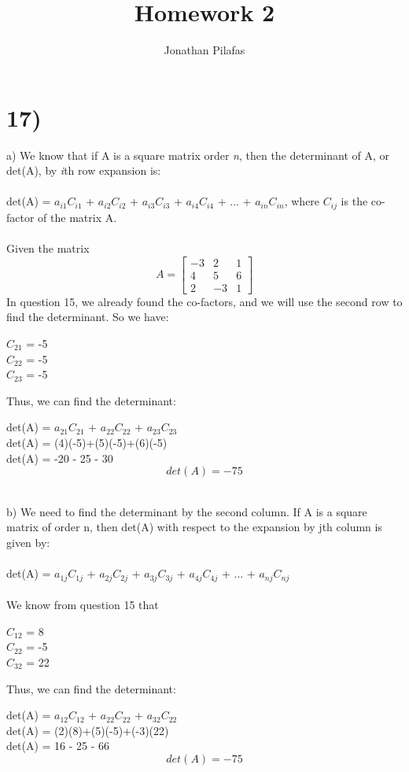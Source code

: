 \documentclass[12pt,a4paper]{extarticle}
\title{Homework 2}
\author{Jonathan Pilafas}
\begin{document}
\maketitle

\section*{17)} 

a) We know that if A is a square matrix order \textit{n}, then the determinant of A, or det(A), by \textit{i}th row 
expansion is:
\\
\\
det(A) = $a_{i1}$$C_{i1}$ + $a_{i2}$$C_{i2}$ + $a_{i3}$$C_{i3}$ + $a_{i4}$$C_{i4}$ + ... + $a_{in}$$C_{in}$, where 
$C_{ij}$ is the co-factor of the matrix A.
\\
\\
Given the matrix
\[
	A = \begin{bmatrix}
		-3 & 2 & 1 \\
		4 & 5 & 6 \\
		2 & -3 & 1
	\end{bmatrix}
\]
In question 15, we already found the co-factors, and we will use
the second row to find the determinant. So we have:
\begin{center}
$C_{21}$ = -5 \\
$C_{22}$ = -5 \\
$C_{23}$ = -5
\end{center}
Thus, we can find the determinant:
\begin{center}
det(A) = $a_{21}$$C_{21}$ + $a_{22}$$C_{22}$ + $a_{23}$$C_{23}$\\
det(A) = (4)(-5)+(5)(-5)+(6)(-5) \\
det(A) = -20 - 25 - 30
\[
\boxed{det(A) = -75}
\]
\end{center}
\\
b) We need to find the determinant by the second column. If A is a square matrix of order n, then det(A) with 
respect to the expansion by jth column is given by:
\\
\\
det(A) = $a_{1j}$$C_{1j}$ + $a_{2j}$$C_{2j}$ + $a_{3j}$$C_{3j}$ + $a_{4j}$$C_{4j}$ + ... + $a_{nj}$$C_{nj}$
\\
\\
We know from question 15 that
\begin{center}
$C_{12}$ = 8 \\
$C_{22}$ = -5 \\
$C_{32}$ = 22
\end{center}
Thus, we can find the determinant:
\begin{center}
det(A) = $a_{12}$$C_{12}$ + $a_{22}$$C_{22}$ + $a_{32}$$C_{22}$\\
det(A) = (2)(8)+(5)(-5)+(-3)(22) \\
det(A) = 16 - 25 - 66
\[
\boxed{det(A) = -75}
\]
\end{center}
\newpage
\end{document}
